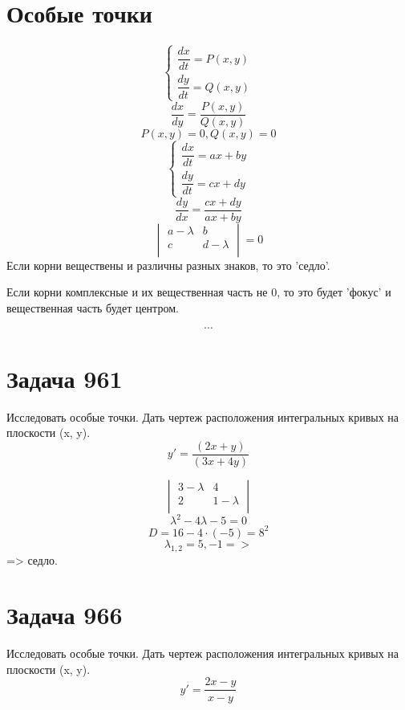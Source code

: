 \section*{Особые точки}
$$\begin{cases}
        \dfrac{dx}{dt}  = P(x, y) \\
        \dfrac{dy}{dt}  = Q(x, y)
    \end{cases}$$
$$ \dfrac{dx}{dy}  = \dfrac{P(x, y)}{Q(x, y)} $$
$$ P(x, y) = 0, Q(x, y) = 0 $$
$$ \begin{cases}
        \dfrac{dx}{dt} = ax + by \\
        \dfrac{dy}{dt} = cx + dy
    \end{cases} $$
$$ \dfrac{dy}{dx}  = \dfrac{cx + dy}{ax + by} $$
$$ \begin{vmatrix}
        a - \lambda & b           \\
        c           & d - \lambda \\
    \end{vmatrix} = 0 $$
Если корни веществены и различны разных знаков, то это 'седло'. \par
Если корни комплексные и их вещественная часть не 0, то это будет 'фокус' и вещественная часть будет центром. \par
$$\cdots$$

\section*{Задача 961}
Исследовать особые точки. Дать чертеж расположения интегральных кривых на плоскости (x, y).
$$y' = \dfrac{(2x + y)}{(3x + 4y)}$$
\begin{solution}
    $$
        \begin{vmatrix}
            3 - \lambda & 4           \\
            2           & 1 - \lambda \\
        \end{vmatrix}$$
    $$ \lambda^2 - 4\lambda - 5 = 0 $$
    $$ D = 16 - 4 \cdot (-5) = 8^2 $$
    $$ \lambda_{1, 2} = 5, -1 => $$
    => седло.
\end{solution}\pagebreak

\section*{Задача 966}
Исследовать особые точки. Дать чертеж расположения интегральных кривых на плоскости (x, y).
$$y' = \dfrac{2x - y}{x - y}$$

